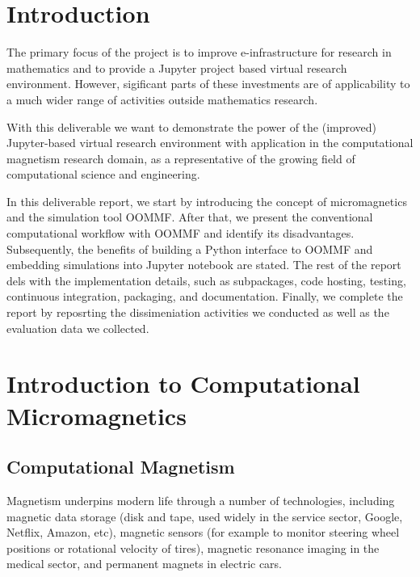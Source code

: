 \documentclass{deliverablereport}
\author{Marijan Beg and Hans Fangohr}
\begin{document}
\maketitle
\githubissuedescription
\newpage
\tableofcontents
\newpage

\section{Introduction}
The primary focus of the \ODK project is to improve e-infrastructure
for research in mathematics and to provide a Jupyter project based
virtual research environment. However, sigificant parts of these
investments are of applicability to a much wider range of activities
outside mathematics research.

With this deliverable we want to demonstrate the power of the
(improved) Jupyter-based virtual research environment with application
in the computational magnetism research domain, as a representative of
the growing field of computational science and engineering.

In this deliverable report, we start by introducing the concept of
micromagnetics and the simulation tool OOMMF. After that, we present
the conventional computational workflow with OOMMF and identify its
disadvantages. Subsequently, the benefits of building a Python
interface to OOMMF and embedding simulations into Jupyter notebook are
stated. The rest of the report dels with the implementation details,
such as subpackages, code hosting, testing, continuous integration,
packaging, and documentation. Finally, we complete the report by
reposrting the dissimeniation activities we conducted as well as the
evaluation data we collected.

\section{Introduction to Computational Micromagnetics}
\subsection{Computational Magnetism}

Magnetism underpins modern life through a number of technologies,
including magnetic data storage (disk and tape, used widely in the
service sector, Google, Netflix, Amazon, etc), magnetic sensors (for
example to monitor steering wheel positions or rotational velocity of
tires), magnetic resonance imaging in the medical sector, and
permanent magnets in electric cars.
\end{document}
